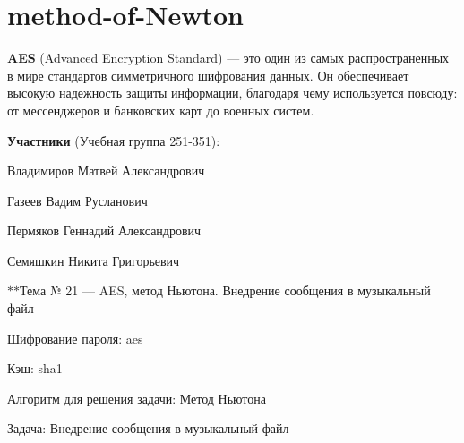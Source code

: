 \chapter{method-\/of-\/\+Newton }
\hypertarget{md__r_e_a_d_m_e}{}\label{md__r_e_a_d_m_e}
\label{md__r_e_a_d_m_e_autotoc_md32}%
%




{\bfseries{AES}} (Advanced Encryption Standard) — это один из самых распространенных в мире стандартов симметричного шифрования данных. Он обеспечивает высокую надежность защиты информации, благодаря чему используется повсюду:\+ от мессенджеров и банковских карт до военных систем.

{\bfseries{Участники}} (Учебная группа 251-\/351):\+ ~\newline

\begin{DoxyItemize}
\item Владимиров Матвей Александрович
\item Газеев Вадим Русланович
\item Пермяков Геннадий Александрович
\item Семяшкин Никита Григорьевич
\end{DoxyItemize}



\texorpdfstring{$\ast$}{*}\texorpdfstring{$\ast$}{*}Тема № 21 — AES, метод Ньютона. Внедрение сообщения в музыкальный файл


\begin{DoxyItemize}
\item Шифрование пароля:\+ aes
\item Кэш:\+ sha1
\item Алгоритм для решения задачи:\+ Метод Ньютона
\item Задача:\+ Внедрение сообщения в музыкальный файл
\end{DoxyItemize}

 